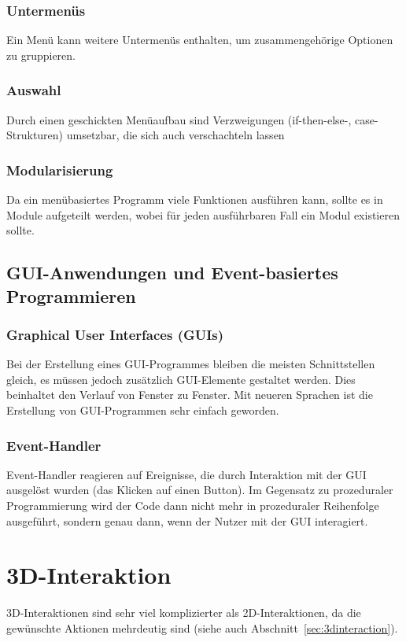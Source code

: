 				\subsubsection{Untermenüs}
					Ein Menü kann weitere Untermenüs enthalten, um zusammengehörige Optionen zu gruppieren.

				\subsubsection{Auswahl}
					Durch einen geschickten Menüaufbau sind Verzweigungen (if-then-else-, case-Strukturen) umsetzbar, die sich auch verschachteln lassen

				\subsubsection{Modularisierung}
					Da ein menübasiertes Programm viele Funktionen ausführen kann, sollte es in Module aufgeteilt werden, wobei für jeden ausführbaren Fall ein Modul existieren sollte.

			\subsection{GUI-Anwendungen und Event-basiertes Programmieren}
				\subsubsection{Graphical User Interfaces (GUIs)}
					Bei der Erstellung eines GUI-Programmes bleiben die meisten Schnittstellen gleich, es müssen jedoch zusätzlich GUI-Elemente gestaltet werden. Dies beinhaltet den Verlauf von Fenster zu Fenster. Mit neueren Sprachen ist die Erstellung von GUI-Programmen sehr einfach geworden.

				\subsubsection{Event-Handler}
					Event-Handler reagieren auf Ereignisse, die durch Interaktion mit der GUI ausgelöst wurden (\zB das Klicken auf einen Button). Im Gegensatz zu prozeduraler Programmierung wird der Code dann nicht mehr in prozeduraler Reihenfolge ausgeführt, sondern genau dann, wenn der Nutzer mit der GUI interagiert.

		\section{3D-Interaktion}
			3D-Interaktionen sind sehr viel komplizierter als 2D-Interaktionen, da die gewünschte Aktionen mehrdeutig sind (siehe auch Abschnitt~\ref{sec:3dinteraction}).

